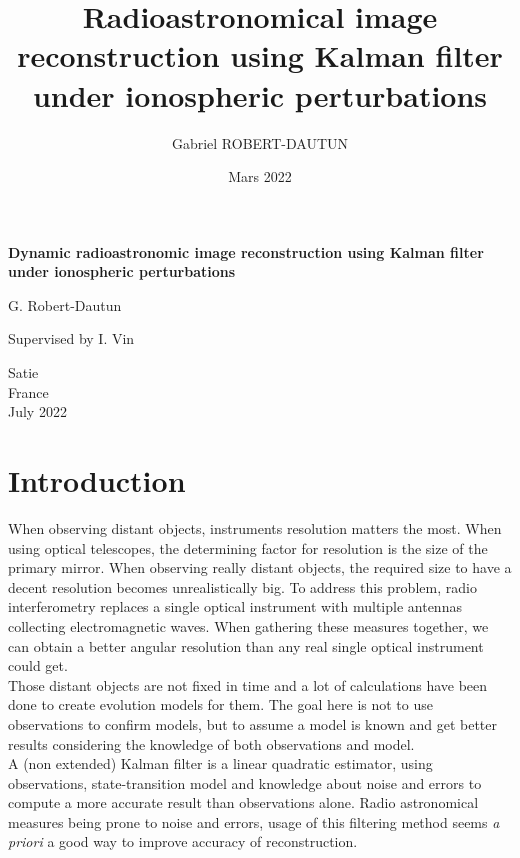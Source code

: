\documentclass[titlepage]{article}
\author{Gabriel ROBERT-DAUTUN}
\date{Mars 2022}
\title{%
	Radioastronomical image reconstruction using Kalman filter under ionospheric perturbations}
\begin{document}
	
	\begin{titlepage}
	
	\vspace*{.3\textheight}
	\huge
	\centering
	\textbf{Dynamic radioastronomic image reconstruction using Kalman filter under ionospheric perturbations}
	
	\vspace{1cm}
	\LARGE
	G. Robert-Dautun
	
	\vfill
	\large
	Supervised by I. Vin
	
	\vspace{0.8cm}
	
	\Large
	Satie\\
	France\\
	July 2022
	
	\end{titlepage}
	
	\newpage
	\tableofcontents
	
	\newpage
	
	\part{Introduction}
	
	When observing distant objects, instruments resolution matters the most. When using optical telescopes, the determining factor for resolution is the size of the primary mirror. When observing really distant objects, the required size to have a decent resolution becomes unrealistically big. To address this problem, radio interferometry replaces a single optical instrument with multiple antennas collecting electromagnetic waves. When gathering these measures together, we can obtain a better angular resolution than any real single optical instrument could get. \\
	
	Those distant objects are not fixed in time and a lot of calculations have been done to create evolution models for them. The goal here is not to use observations to confirm models, but to assume a model is known and get better results considering the knowledge of both observations and model. \\ 
	
	A (non extended) Kalman filter is a linear quadratic estimator, using observations, state-transition model and knowledge about noise and errors to compute a more accurate result than observations alone. Radio astronomical measures being prone to noise and errors, usage of this filtering method seems \emph{a priori} a good way to improve accuracy of reconstruction. \\
		
\end{document}
